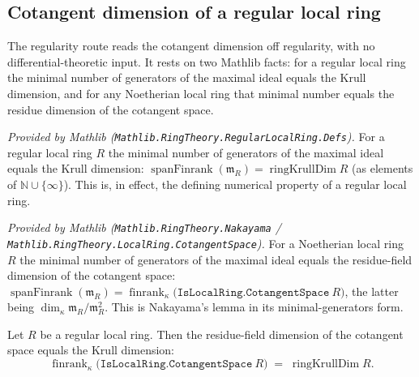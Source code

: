 \subsection*{Cotangent dimension of a regular local ring}

The regularity route reads the cotangent dimension off regularity, with no
differential-theoretic input. It rests on two Mathlib facts: for a regular
local ring the minimal number of generators of the maximal ideal equals the
Krull dimension, and for any Noetherian local ring that minimal number equals
the residue dimension of the cotangent space.

\begin{lemma}
  \label{lem:isRegularLocalRing_spanFinrank_eq_ringKrullDim}
  \mathlibok
  \textit{Provided by Mathlib
  (\texttt{Mathlib.RingTheory.RegularLocalRing.Defs}).}
  For a regular local ring \(R\) the minimal number of generators of the
  maximal ideal equals the Krull dimension:
  \(\operatorname{spanFinrank}(\mathfrak m_R) =
  \operatorname{ringKrullDim} R\) (as elements of \(\mathbb N \cup
  \{\infty\}\)). This is, in effect, the defining numerical property of a
  regular local ring.
\end{lemma}

\begin{lemma}
  \label{lem:spanFinrank_eq_finrank_cotangentSpace}
  \mathlibok
  \textit{Provided by Mathlib
  (\texttt{Mathlib.RingTheory.Nakayama} /
  \texttt{Mathlib.RingTheory.LocalRing.CotangentSpace}).}
  For a Noetherian local ring \(R\) the minimal number of generators of the
  maximal ideal equals the residue-field dimension of the cotangent space:
  \(\operatorname{spanFinrank}(\mathfrak m_R) =
  \operatorname{finrank}_{\kappa}
  \bigl(\texttt{IsLocalRing.CotangentSpace}\ R\bigr)\), the latter being
  \(\dim_\kappa \mathfrak m_R / \mathfrak m_R^2\). This is Nakayama's lemma in
  its minimal-generators form.
\end{lemma}

\begin{lemma}

  \label{lem:finrank_cotangent_eq_ringKrullDim_of_regular}
  Let \(R\) be a regular local ring. Then the residue-field dimension of the
  cotangent space equals the Krull dimension:
  \[
    \operatorname{finrank}_{\kappa}
      \bigl(\texttt{IsLocalRing.CotangentSpace}\ R\bigr)
    \;=\;
    \operatorname{ringKrullDim} R .
  \]
\end{lemma}

